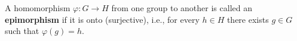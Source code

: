 A homomorphism $\varphi: G \to H$ from one group to another is called an \textbf{epimorphism} if it is onto (surjective), i.e., for every $h \in H$ there exists $g \in G$ such that $\varphi(g) = h$.
